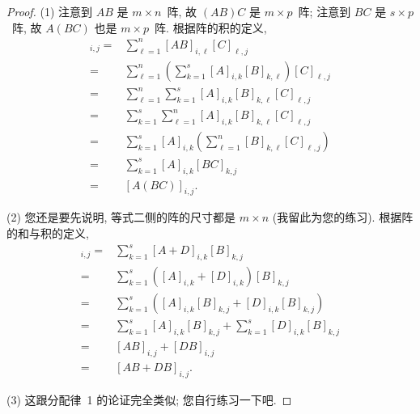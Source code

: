 \documentclass[%
    UTF8,%
    fontset=none,%
    punct=kaiming,%
    zihao=-4,%
    a4paper,%
    oneside,%
]{ctexbook}
\begin{document}
\begin{proof}
    (1)
    注意到 \(AB\) 是 \(m \times n\)~阵,
    故 \((AB)C\) 是 \(m \times p\)~阵;
    注意到 \(BC\) 是 \(s \times p\)~阵,
    故 \(A(BC)\) 也是 \(m \times p\)~阵.
    根据阵的积的定义,
    \begin{align*}
        [(AB)C]_{i,j}
        = {} &
        \sum_{\ell = 1}^{n} {[AB]_{i,\ell} [C]_{\ell,j}}
        \\
        = {} &
        \sum_{\ell = 1}^{n} {
        \left(\sum_{k = 1}^{s} {[A]_{i,k} [B]_{k,\ell}} \right)
        [C]_{\ell,j} }
        \\
        = {} &
        \sum_{\ell = 1}^{n} {
        \sum_{k = 1}^{s} {
        [A]_{i,k} [B]_{k,\ell} [C]_{\ell,j} }}
        \\
        = {} &
        \sum_{k = 1}^{s} {
        \sum_{\ell = 1}^{n} {
        [A]_{i,k} [B]_{k,\ell} [C]_{\ell,j}}}
        \\
        = {} &
        \sum_{k = 1}^{s} {
        [A]_{i,k}
        \left(
        \sum_{\ell = 1}^{n} {[B]_{k,\ell} [C]_{\ell,j}}
        \right) }
        \\
        = {} &
        \sum_{k = 1}^{s} {[A]_{i,k} [BC]_{k,j}}
        \\
        = {} &
        [A(BC)]_{i,j}.
    \end{align*}

    (2)
    您还是要先说明, 等式二侧的阵的尺寸都是 \(m \times n\)
    (我留此为您的练习).
    根据阵的和与积的定义,
    \begin{align*}
        [(A + D)B]_{i,j}
        = {} &
        \sum_{k = 1}^{s} {[A + D]_{i,k} [B]_{k,j}}
        \\
        = {} &
        \sum_{k = 1}^{s} {([A]_{i,k} + [D]_{i,k}) [B]_{k,j}}
        \\
        = {} &
        \sum_{k = 1}^{s} {([A]_{i,k} [B]_{k,j}
        + [D]_{i,k} [B]_{k,j})}
        \\
        = {} &
        \sum_{k = 1}^{s} {[A]_{i,k} [B]_{k,j}}
        +
        \sum_{k = 1}^{s} {[D]_{i,k} [B]_{k,j}}
        \\
        = {} &
        [AB]_{i,j} + [DB]_{i,j}
        \\
        = {} &
        [AB + DB]_{i,j}.
    \end{align*}

    (3)
    这跟分配律~1 的论证完全类似;
    您自行练习一下吧.


\end{proof}
\end{document}
